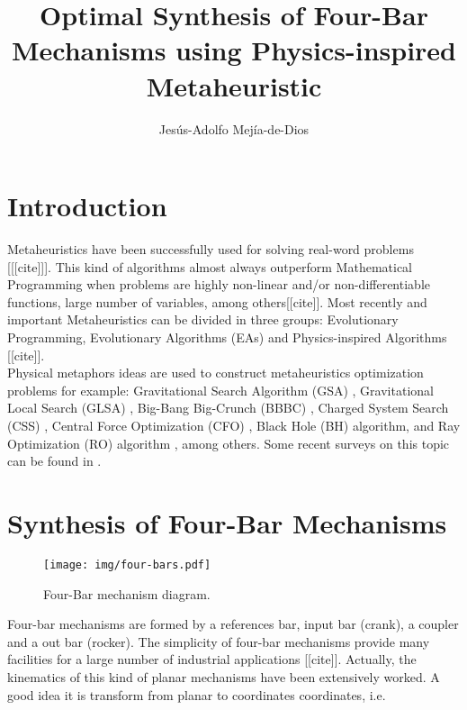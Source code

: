 \documentclass[12pt,letterpape]{article}
\title{Optimal Synthesis of Four-Bar Mechanisms using Physics-inspired Metaheuristic}
\author{Jesús-Adolfo Mejía-de-Dios}
\begin{document}
\maketitle

\section{Introduction} %
\label{sec:introduction}

Metaheuristics have been successfully used for solving real-word problems [[[cite]]].
This kind of algorithms almost always outperform Mathematical Programming when problems
are highly non-linear and/or non-differentiable functions, large number of variables, 
among others[[cite]]. Most recently and important Metaheuristics can be divided in three
groups: Evolutionary Programming, Evolutionary Algorithms (EAs) and Physics-inspired Algorithms [[cite]].\\

Physical metaphors ideas are used to construct metaheuristics optimization problems
for example: Gravitational  Search Algorithm (GSA) \cite{rashedi2009gsa}, 
Gravitational Local Search (GLSA) \cite{glsa}, Big-Bang Big-Crunch (BBBC) \cite{erol2006new}, 
Charged System Search (CSS) \cite{kaveh2010novel}, Central Force Optimization 
(CFO) \cite{cfo2007}, Black Hole (BH) \cite{hatamlou2013black} algorithm, and Ray 
Optimization (RO) algorithm \cite{kaveh2012new}, among others. Some recent surveys 
on this topic can be found in \cite{fisicaSurvey,biswas2013physics,xie2011convergence,DBLP:journals/corr/FisterYFBF13}. 

\section{Synthesis of Four-Bar Mechanisms} %
\label{sec:synthesis_of_four_bar_mechanisms}

\begin{figure}[!ht]
	\centering
	\texttt{[image: img/four-bars.pdf]}
	\caption{Four-Bar mechanism diagram.}
	\label{fig:fourbar}
\end{figure}

Four-bar mechanisms are formed by a references bar, input bar (crank), a coupler and a out bar (rocker). The simplicity of four-bar mechanisms provide many facilities for a large number of industrial applications [[cite]]. Actually, the kinematics of this kind of planar mechanisms have been extensively worked. A good idea it is transform from planar to coordinates coordinates, i.e.
\end{document}
